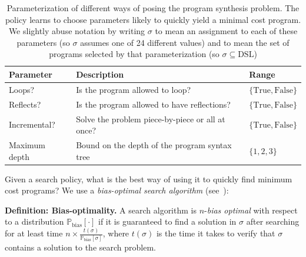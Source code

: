 \documentclass{article}
\newcommand{\probability}{\mathds{P}} %
\theoremstyle{definition}
\begin{document}
\begin{table}[h]\centering
  \caption{Parameterization of different ways of posing the program synthesis problem. The policy learns to choose parameters likely to quickly yield a minimal cost program. We slightly abuse notation by writing $\sigma $ to mean an assignment to each of these parameters (so $\sigma $ assumes one of 24 different values) and to mean the set of programs selected by that parameterization (so $\sigma \subseteq \text{DSL}$)}\label{policyOutput}
  \begin{tabular}{lll}\toprule
  Parameter&Description&Range\\\midrule
  Loops?&Is the program allowed to loop?&$\{\text{True},\text{False}\}$\\
  Reflects?&Is the program allowed to have reflections?&$\{\text{True},\text{False}\}$\\
  Incremental?&Solve the problem piece-by-piece or all at once?&$\{\text{True},\text{False}\}$\\
  Maximum depth& Bound on the depth of the program syntax tree&$\{1,2,3\}$
  \\\bottomrule
  \end{tabular}
  \end{table}


Given a search policy, what is the best way of using it to quickly find minimum cost programs?
We use a \emph{bias-optimal search algorithm} (see~\cite{schmidhuber2004optimal}):

\noindent\textbf{Definition: Bias-optimality.}
   A search algorithm is $n$-\emph{bias optimal}
with respect to a distribution $\probability_{\text{bias}}[\cdot ]$ if it is
guaranteed to find a solution in $\sigma $ after searching for at least time
$n\times\frac{t(\sigma )}{\probability_{\text{bias}}[\sigma ]}$, where $t(\sigma )$ is the time it
takes to verify that $\sigma $ contains a solution to the
search problem.
\end{document}
